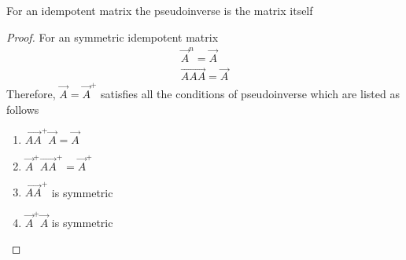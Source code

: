 \begin{lemma}
\label{oct/2/66/lemma:pseudoinverse}
    For an idempotent matrix the pseudoinverse is the matrix itself
\end{lemma}
\begin{proof}
    For an symmetric idempotent matrix
    \begin{align}
        \vec{A}^n=\vec{A}\\
        \vec{AAA}=\vec{A}
    \end{align}
    Therefore, $\vec{A}=\vec{A}^+$ satisfies all the conditions of pseudoinverse which are listed as follows
\begin{enumerate}
    \item $\vec{AA}^+\vec{A}=\vec{A}$
    \item $\vec{A}^+\vec{AA}^+=\vec{A}^+$
    \item $\vec{AA}^+$ is symmetric
    \item $\vec{A}^+\vec{A}$ is symmetric
\end{enumerate}
\end{proof}

